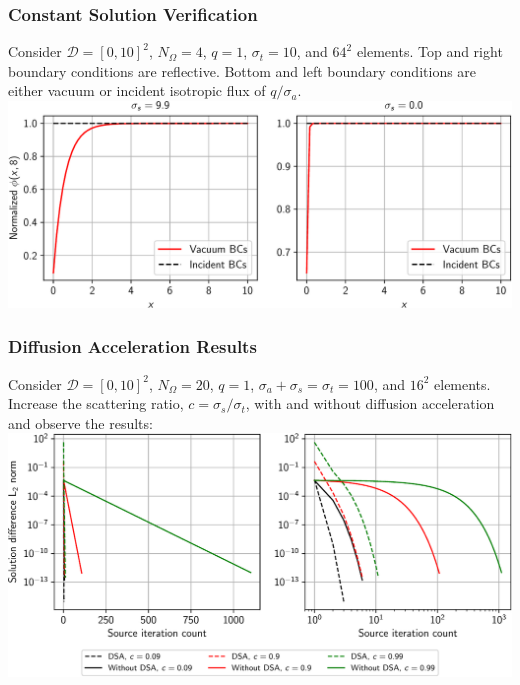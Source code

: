 \documentclass[xcolor={usenames,dvipsnames,svgnames,table}, 10pt]{beamer}
\newcommand{\spatial}{\mathcal{D}} %
\begin{document}

\begin{frame}\frametitle{Constant Solution Verification}
	\vfill
	Consider $\spatial = [0, 10]^2$, $N_\Omega = 4$, $q = 1$, $\sigma_t = 10$, and $64^2$ elements. Top and right boundary conditions are reflective. Bottom and left boundary conditions are either vacuum or incident isotropic flux of $q / \sigma_a$.
	\vfill
	\centering
	\includegraphics[width=0.9\linewidth]{plots/constant_solution}
	\vfill
\end{frame}


\begin{frame}\frametitle{Diffusion Acceleration Results}
	\vfill
	Consider $\spatial = [0, 10]^2$, $N_\Omega = 20$, $q = 1$, $\sigma_a + \sigma_s = \sigma_t = 100$, and $16^2$ elements. Increase the scattering ratio, $c = \sigma_s / \sigma_t$, with and without diffusion acceleration and observe the results:
	\vfill
	\centering
	\includegraphics[width=0.9\linewidth]{plots/dsa_residuals}
	\vfill
\end{frame}

\end{document}
